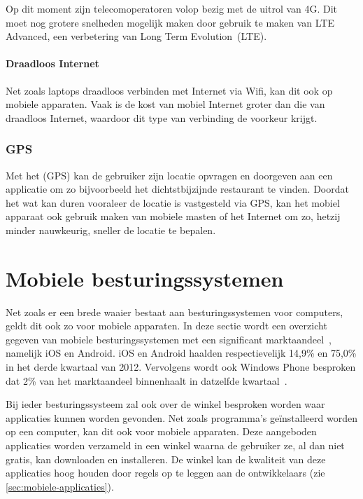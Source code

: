 Op dit moment zijn telecomoperatoren volop bezig met de uitrol van 4G.
Dit moet nog grotere snelheden mogelijk maken door gebruik te maken van LTE Advanced, een verbetering van Long Term Evolution~(LTE).

\paragraph{Draadloos Internet}
Net zoals laptops draadloos verbinden met Internet via Wifi, kan dit ook op mobiele apparaten.
Vaak is de kost van mobiel Internet groter dan die van draadloos Internet, waardoor dit type van verbinding de voorkeur krijgt.

\subsubsection{GPS}
Met het  (GPS) kan de gebruiker zijn locatie opvragen en doorgeven aan een applicatie om zo bijvoorbeeld het dichtstbijzijnde restaurant te vinden. 
Doordat het wat kan duren vooraleer de locatie is vastgesteld via GPS, kan het mobiel apparaat ook gebruik maken van mobiele masten of het Internet om zo, hetzij minder nauwkeurig, sneller de locatie te bepalen.


\section{Mobiele besturingssystemen}
\label{sec:mobiele-besturingssystemen}
Net zoals er een brede waaier bestaat aan besturingssystemen voor computers, geldt dit ook zo voor mobiele apparaten. 
In deze sectie wordt een overzicht gegeven van mobiele besturingssystemen met een significant marktaandeel~\cite{David2011, Hales2012}, namelijk iOS en Android.
iOS en Android haalden respectievelijk 14,9\% en 75,0\% in het derde kwartaal van 2012.
Vervolgens wordt ook Windows Phone besproken dat 2\% van het marktaandeel binnenhaalt in datzelfde kwartaal~\cite{Protalinski2012}.

Bij ieder besturingssysteem zal ook over de winkel besproken worden waar applicaties kunnen worden gevonden.
Net zoals programma's geïnstalleerd worden op een computer, kan dit ook voor mobiele apparaten.
Deze aangeboden applicaties worden verzameld in een winkel waarna de gebruiker ze, al dan niet gratis, kan downloaden en installeren.
De winkel kan de kwaliteit van deze applicaties hoog houden door regels op te leggen aan de ontwikkelaars (zie \ref{sec:mobiele-applicaties}).

